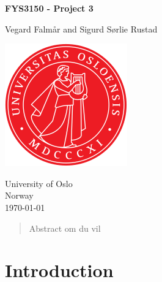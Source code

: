 \documentclass[reprint, english,notitlepage,nofootinbib]{revtex4-1}  %
\begin{document}
\begin{titlepage}
	\begin{center}
	\textbf{FYS3150 - Project 3}

	\vspace{0.2cm}
	Vegard Falmår and Sigurd Sørlie Rustad
	
	\vspace{0.5cm}
	\includegraphics[scale=0.5]{UIO}
	\vspace{0.8cm}

	University of Oslo\\
	Norway\\
	\today	
		
	\end{center}
	\tableofcontents
	\clearpage
\end{titlepage}

\begin{abstract}
Abstract om du vil
\end{abstract}
\maketitle                              %


\section{Introduction}
\end{document}
